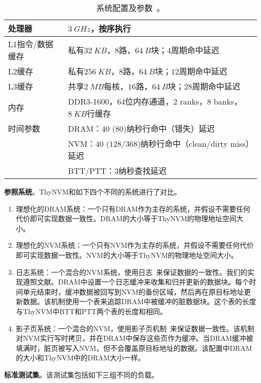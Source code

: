 \begin{table}[!h]
\centering
\caption{系统配置及参数~\cite{Lee:2009:APC:1555754.1555758}。}
\label{table:config}
\begin{tabular}{l|l}
\toprule[1.5pt]
处理器 & $3~GHz$，按序执行 \\
\hline
L1指令/数据缓存 & 私有$32~KB$，$8$路，$64~B$块；$4$周期命中延迟 \\
L2缓存 & 私有$256~KB$，$8$路，$64~B$块；$12$周期命中延迟 \\
L3缓存 & 共享$2~MB$每核，$16$路，$64~B$块；$28$周期命中延迟 \\
\hline
内存 & DDR3-1600，$64$位内存通道，$2$ ranks，$8$ banks，$8~KB$行缓存 \\
时间参数 & DRAM：$40$ ($80$)纳秒行命中（错失）延迟 \\
               & NVM：$40$ ($128$/$368$)纳秒行命中（clean/dirty miss）延迟 \\
               & BTT/PTT：$3$纳秒查找延迟 \\
\toprule[1.5pt]
\end{tabular}
\end{table}

\textbf{参照系统}。ThyNVM和如下四个不同的系统进行了对比。
\begin{enumerate}
\item 理想化的DRAM系统：一个只有DRAM作为主存的系统，并假设不需要任何代价即可实现数据一致性。DRAM的大小等于ThyNVM的物理地址空间大小。 
\item 理想化的NVM系统：一个只有NVM作为主存的系统，并假设不需要任何代价即可实现数据一致性。NVM的大小等于ThyNVM的物理地址空间大小。 
\item 日志系统：一个混合的NVM系统，使用日志~\cite{DeWitt:1984:ITM:602259.602261, Hagmann:1987:RCF:41457.37518,
ext4}来保证数据的一致性。我们的实现遵照文献\cite{Remzi:Journaling}。DRAM中设置一个日志缓冲来收集和归并更新的数据块。每个时间单元结束时，缓冲数据被回写到NVM的备份区域，然后再在原目标地址更新数据。该机制使用一个表来追踪DRAM中被缓冲的脏数据块。这个表的长度与ThyNVM中BTT和PTT两个表的长度和相同。 
\item 影子页系统：一个混合的NVM，使用影子页机制~\cite{bernstein2009principles}来保证数据一致性。该机制对NVM实行写时拷贝，并在DRAM中保存这些页作为缓冲。当DRAM缓冲被填满时，脏页被写入NVM，但不会覆盖原目标地址的数据。该配置中DRAM的大小和ThyNVM中的DRAM大小一样。
\end{enumerate}
 
\textbf{标准测试集}。该测试集包括如下三组不同的负载。

